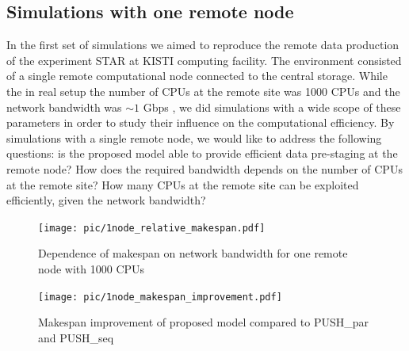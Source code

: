 \documentclass{svjour3}                     %
\begin{document}
\subsection{Simulations with one remote node}
In the first set of simulations we aimed to reproduce the remote data production of the experiment STAR at KISTI computing facility. The environment consisted of a single remote computational node connected to the central storage. While the in real setup the number of CPUs at the remote site was 1000 CPUs and the network bandwidth was $\sim1$ Gbps \cite{KISTI-production}, we did simulations with a wide scope of these parameters in order to study their influence on the computational efficiency. By simulations with a single remote node, we would like to address the following questions: is the proposed model able to provide efficient data pre-staging at the remote node? How does the required bandwidth depends on the number of CPUs at the remote site? How many CPUs at the remote site can be exploited efficiently, given the network bandwidth?

\begin{figure}[h]
\centering
\begin{minipage}{.7\textwidth}
\centering
    \texttt{[image: pic/1node\_relative\_makespan.pdf]}

    \caption{Dependence of makespan on network bandwidth for one remote node with 1000 CPUs}
    \label{1node_relative_makespan}
\end{minipage}\hspace{1pc}%
\begin{minipage}{.7\textwidth}
\centering
    \texttt{[image: pic/1node\_makespan\_improvement.pdf]}
    \caption{Makespan improvement of proposed model compared to PUSH\_par and PUSH\_seq}
    \label{1node_makespan_improvement}
\end{minipage} 
\end{figure}
\end{document}
